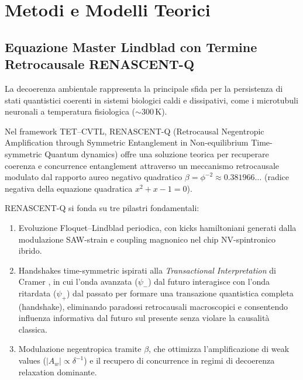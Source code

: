 \documentclass[11pt,a4paper]{article}
\let\oldcite\cite
\renewcommand{\cite}{\protect\oldcite}
\theoremstyle{plain}
\theoremstyle{definition}
\begin{document}
\section{Metodi e Modelli Teorici}

\subsection{Equazione Master Lindblad con Termine Retrocausale RENASCENT-Q}

La decoerenza ambientale rappresenta la principale sfida per la persistenza di stati quantistici coerenti in sistemi biologici caldi e dissipativi, come i microtubuli neuronali a temperatura fisiologica ($\sim 300\,\text{K}$). 

\vspace{0.3cm}

Nel framework TET–CVTL, RENASCENT-Q (Retrocausal Negentropic Amplification through Symmetric Entanglement in Non-equilibrium Time-symmetric Quantum dynamics) offre una soluzione teorica per recuperare coerenza e concurrence entanglement attraverso un meccanismo retrocausale modulato dal rapporto aureo negativo quadratico $\beta = \phi^{-2} \approx 0.381966\dots$ (radice negativa della equazione quadratica $x^2 + x - 1 = 0$).

\vspace{0.3cm}

RENASCENT-Q si fonda su tre pilastri fondamentali:

\begin{enumerate}
    \item Evoluzione Floquet–Lindblad periodica, con kicks hamiltoniani generati dalla modulazione SAW-strain e coupling magnonico nel chip NV-spintronico ibrido.
    \item Handshakes time-symmetric ispirati alla \emph{Transactional Interpretation} di Cramer \cite{Cramer1986, Cramer2001, Cramer2017}, in cui l'onda avanzata ($\psi_-$) dal futuro interagisce con l'onda ritardata ($\psi_+$) dal passato per formare una transazione quantistica completa (handshake), eliminando paradossi retrocausali macroscopici e consentendo influenza informativa dal futuro sul presente senza violare la causalità classica.
    \item Modulazione negentropica tramite $\beta$, che ottimizza l'amplificazione di weak values ($|A_w| \propto \delta^{-1}$) e il recupero di concurrence in regimi di decoerenza relaxation dominante.
\end{enumerate}
\end{document}
